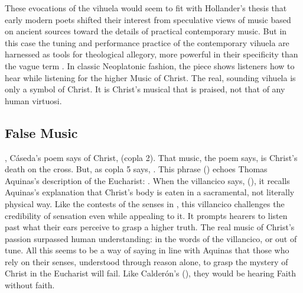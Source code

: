 These evocations of the vihuela would seem to fit with Hollander's thesis that
early modern poets shifted their interest from speculative views of music based
on ancient sources toward the details of practical contemporary music.
But in this case the tuning and performance practice of the contemporary
vihuela are harnessed as tools for theological allegory, more powerful in their
specificity than the vague term .
In classic Neoplatonic fashion, the piece shows listeners how to hear
 while listening for the higher Music of Christ. 
The real, sounding vihuela is only a symbol of Christ.
It is Christ's musical  that is praised, not that of any
human virtuosi.


\subsection{False Music}

, Cáseda's poem says of Christ,
 (copla 2).
That music, the poem says, is Christ's death on the cross.
But, as copla 5 says, .
This phrase () echoes Thomas Aquinas's
description of the Eucharist: .%
    \Autocite[question 75, article 1, ]{Aquinas:Summa3}
When the villancico says,  (),
it recalls Aquinas's explanation that Christ's body is eaten in a sacramental,
not literally physical way.
Like the contests of the senses in , this villancico
challenges the credibility of sensation even while appealing to it.
It prompts hearers to listen past what their ears perceive to grasp a higher
truth.
The real music of Christ's passion surpassed human understanding: in the words
of the villancico,  or out of tune.
All this seems to be a way of saying in line with Aquinas that those who rely
on their senses, understood through reason alone, to grasp the mystery of
Christ in the Eucharist will fail.
Like Calderón's  (), they would be
hearing Faith without faith.

